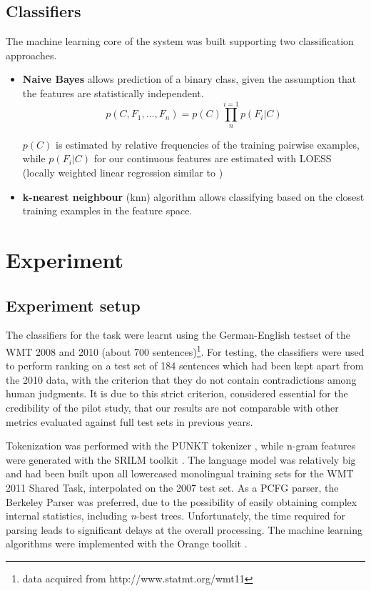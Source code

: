 \documentclass[11pt]{article}
\begin{document}
\subsection{Classifiers}
The machine learning core of the system was built supporting two
classification approaches. 
\begin{itemize}
  \item \textbf{Naive Bayes} allows prediction of a binary class, given the
  assumption that the features are statistically independent. 
  \[
  p(C, F_1, \ldots, F_n) = p(C)\prod_{n}^{i=1}p(F_i|C)
  \]
  
  \(p(C)\) is estimated by relative frequencies of the training pairwise
  examples, while \(p(F_i|C)\) for our continuous features are
  estimated with LOESS (locally weighted linear regression similar to
  \cite{cleveland1979robust})
  \item \textbf{k-nearest neighbour} (knn) algorithm allows classifying based
  on the closest training examples in the feature space. 
\end{itemize}





\section{Experiment}
\subsection{Experiment setup}
The classifiers for the task were learnt using the German-English testset
 of the \textsc{WMT} 2008 and 2010 (about 700
 sentences)\footnote{data acquired from http://www.statmt.org/wmt11}. For
 testing, the classifiers were used to perform ranking on a test set of 184
 sentences which had been kept apart from the 2010 data, with the criterion that
 they do not contain contradictions among human judgments. It is due to this
 strict criterion, considered essential for the credibility of the pilot study,
 that our results are not comparable with other metrics evaluated against full
 test sets in previous years.
 
 Tokenization was performed with the \textsc{PUNKT} tokenizer
 \cite{Kiss_2006unsupervised,Garrette_anextensible}, while n-gram features were
 generated with the \textsc{SRILM} toolkit \cite{Stolcke02srilm}.
 The language model was relatively big and had been built upon all lowercased
 monolingual training sets for the WMT 2011 Shared Task, interpolated on the
 2007 test set. As a PCFG parser, the Berkeley Parser
 \cite{Petrov07improvedinference} was preferred, due to the possibility of
 easily obtaining complex internal statistics, including \textit{n}-best trees.
 Unfortunately, the time required for parsing leads to significant delays at
 the overall processing. The machine learning algorithms were implemented with the Orange
 toolkit \cite{demsar2004orange}.
\end{document}
